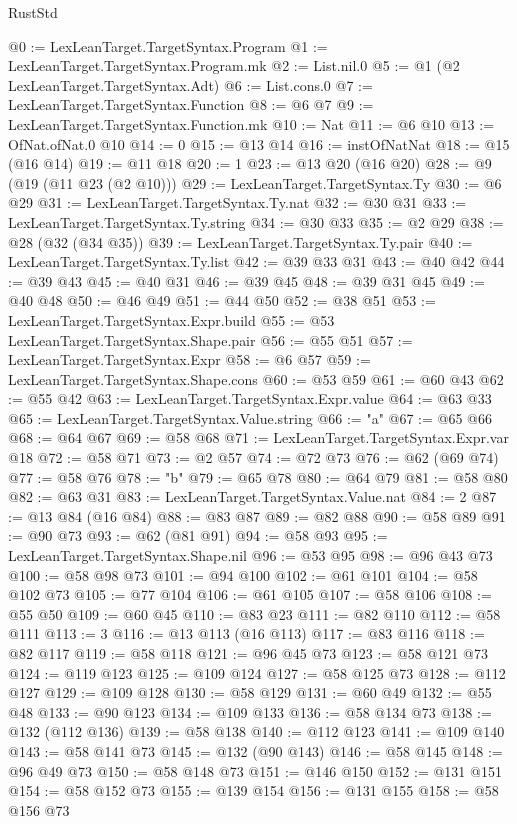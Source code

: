 \begin{lexlean}{RustStd}
\begin{coremodule}
{\begin{coremodule}
{{{{{@0 := LexLeanTarget.TargetSyntax.Program
@1 := LexLeanTarget.TargetSyntax.Program.mk
@2 := List.nil.{0}
@5 := @1 (@2 LexLeanTarget.TargetSyntax.Adt)
@6 := List.cons.{0}
@7 := LexLeanTarget.TargetSyntax.Function
@8 := @6 @7
@9 := LexLeanTarget.TargetSyntax.Function.mk
@10 := Nat
@11 := @6 @10
@13 := OfNat.ofNat.{0} @10
@14 := 0
@15 := @13 @14
@16 := instOfNatNat
@18 := @15 (@16 @14)
@19 := @11 @18
@20 := 1
@23 := @13 @20 (@16 @20)
@28 := @9 (@19 (@11 @23 (@2 @10)))
@29 := LexLeanTarget.TargetSyntax.Ty
@30 := @6 @29
@31 := LexLeanTarget.TargetSyntax.Ty.nat
@32 := @30 @31
@33 := LexLeanTarget.TargetSyntax.Ty.string
@34 := @30 @33
@35 := @2 @29
@38 := @28 (@32 (@34 @35))
@39 := LexLeanTarget.TargetSyntax.Ty.pair
@40 := LexLeanTarget.TargetSyntax.Ty.list
@42 := @39 @33 @31
@43 := @40 @42
@44 := @39 @43
@45 := @40 @31
@46 := @39 @45
@48 := @39 @31 @45
@49 := @40 @48
@50 := @46 @49
@51 := @44 @50
@52 := @38 @51
@53 := LexLeanTarget.TargetSyntax.Expr.build
@55 := @53 LexLeanTarget.TargetSyntax.Shape.pair
@56 := @55 @51
@57 := LexLeanTarget.TargetSyntax.Expr
@58 := @6 @57
@59 := LexLeanTarget.TargetSyntax.Shape.cons
@60 := @53 @59
@61 := @60 @43
@62 := @55 @42
@63 := LexLeanTarget.TargetSyntax.Expr.value
@64 := @63 @33
@65 := LexLeanTarget.TargetSyntax.Value.string
@66 := "a"
@67 := @65 @66
@68 := @64 @67
@69 := @58 @68
@71 := LexLeanTarget.TargetSyntax.Expr.var @18
@72 := @58 @71
@73 := @2 @57
@74 := @72 @73
@76 := @62 (@69 @74)
@77 := @58 @76
@78 := "b"
@79 := @65 @78
@80 := @64 @79
@81 := @58 @80
@82 := @63 @31
@83 := LexLeanTarget.TargetSyntax.Value.nat
@84 := 2
@87 := @13 @84 (@16 @84)
@88 := @83 @87
@89 := @82 @88
@90 := @58 @89
@91 := @90 @73
@93 := @62 (@81 @91)
@94 := @58 @93
@95 := LexLeanTarget.TargetSyntax.Shape.nil
@96 := @53 @95
@98 := @96 @43 @73
@100 := @58 @98 @73
@101 := @94 @100
@102 := @61 @101
@104 := @58 @102 @73
@105 := @77 @104
@106 := @61 @105
@107 := @58 @106
@108 := @55 @50
@109 := @60 @45
@110 := @83 @23
@111 := @82 @110
@112 := @58 @111
@113 := 3
@116 := @13 @113 (@16 @113)
@117 := @83 @116
@118 := @82 @117
@119 := @58 @118
@121 := @96 @45 @73
@123 := @58 @121 @73
@124 := @119 @123
@125 := @109 @124
@127 := @58 @125 @73
@128 := @112 @127
@129 := @109 @128
@130 := @58 @129
@131 := @60 @49
@132 := @55 @48
@133 := @90 @123
@134 := @109 @133
@136 := @58 @134 @73
@138 := @132 (@112 @136)
@139 := @58 @138
@140 := @112 @123
@141 := @109 @140
@143 := @58 @141 @73
@145 := @132 (@90 @143)
@146 := @58 @145
@148 := @96 @49 @73
@150 := @58 @148 @73
@151 := @146 @150
@152 := @131 @151
@154 := @58 @152 @73
@155 := @139 @154
@156 := @131 @155
@158 := @58 @156 @73
}}}}}
\end{coremodule}}
\end{coremodule}
\end{lexlean}
